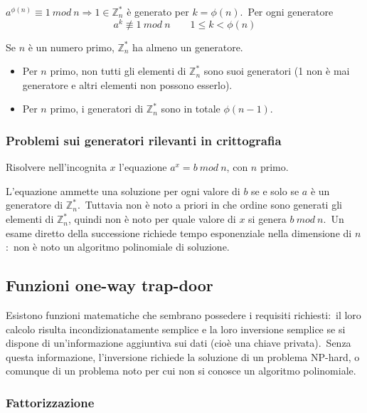 \begin{theorem}[Eulero]
    $a^{\phi(n)} \equiv 1\ \mathit{mod}\ n \Rightarrow 1 \in \mathbb{Z}_n^*$ è generato per $k = \phi(n)$.\
    Per ogni generatore \[a^k \not\equiv 1\ \mathit{mod}\ n\qquad 1\leq k < \phi(n)\]
\end{theorem}

\begin{theorem}
    Se $n$ è un numero primo, $\mathbb{Z}_n^*$ ha almeno un generatore.\
\end{theorem}

\begin{itemize}
    \item Per $n$ primo, non tutti gli elementi di $\mathbb{Z}_n^*$ sono suoi generatori (1 non è mai generatore e altri elementi non possono esserlo).
    \item Per $n$ primo, i generatori di $\mathbb{Z}_n^*$ sono in totale $\phi(n-1)$.
\end{itemize}

\subsubsection{Problemi sui generatori rilevanti in crittografia}

Risolvere nell'incognita $x$ l'equazione $a^x = b\ \mathit{mod}\ n$, con $n$ primo.

L'equazione ammette una soluzione per ogni valore di $b$ se e solo se $a$ è un generatore di $\mathbb{Z}_n^*$.\
Tuttavia non è noto a priori in che ordine sono generati gli elementi di $\mathbb{Z}_n^*$, quindi non è noto per quale valore di $x$ si genera $b\ \mathit{mod}\ n$.\
Un esame diretto della successione richiede tempo esponenziale nella dimensione di $n$:\ non è noto un algoritmo polinomiale di soluzione.\

\subsection{Funzioni one-way trap-door}

Esistono funzioni matematiche che sembrano possedere i requisiti richiesti:\ il loro calcolo risulta incondizionatamente semplice e la loro inversione semplice se si dispone di un'informazione aggiuntiva sui dati (cioè una chiave privata).\
Senza questa informazione, l'inversione richiede la soluzione di un problema NP-hard, o comunque di un problema noto per cui non si conosce un algoritmo polinomiale.\

\subsubsection{Fattorizzazione}

